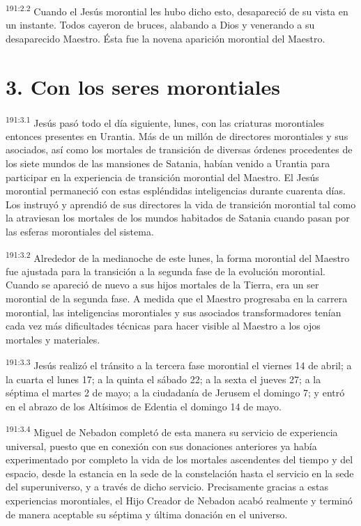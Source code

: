 \par 
\textsuperscript{191:2.2} Cuando el Jesús morontial les hubo dicho esto, desapareció de su vista en un instante. Todos cayeron de bruces, alabando a Dios y venerando a su desaparecido Maestro. Ésta fue la novena aparición morontial del Maestro.

\section*{3. Con los seres morontiales}
\par 
\textsuperscript{191:3.1} Jesús pasó todo el día siguiente, lunes, con las criaturas morontiales entonces presentes en Urantia. Más de un millón de directores morontiales y sus asociados, así como los mortales de transición de diversas órdenes procedentes de los siete mundos de las mansiones de Satania, habían venido a Urantia para participar en la experiencia de transición morontial del Maestro. El Jesús morontial permaneció con estas espléndidas inteligencias durante cuarenta días. Los instruyó y aprendió de sus directores la vida de transición morontial tal como la atraviesan los mortales de los mundos habitados de Satania cuando pasan por las esferas morontiales del sistema.

\par 
\textsuperscript{191:3.2} Alrededor de la medianoche de este lunes, la forma morontial del Maestro fue ajustada para la transición a la segunda fase de la evolución morontial. Cuando se apareció de nuevo a sus hijos mortales de la Tierra, era un ser morontial de la segunda fase. A medida que el Maestro progresaba en la carrera morontial, las inteligencias morontiales y sus asociados transformadores tenían cada vez más dificultades técnicas para hacer visible al Maestro a los ojos mortales y materiales.

\par 
\textsuperscript{191:3.3} Jesús realizó el tránsito a la tercera fase morontial el viernes 14 de abril; a la cuarta el lunes 17; a la quinta el sábado 22; a la sexta el jueves 27; a la séptima el martes 2 de mayo; a la ciudadanía de Jerusem el domingo 7; y entró en el abrazo de los Altísimos de Edentia el domingo 14 de mayo.

\par 
\textsuperscript{191:3.4} Miguel de Nebadon completó de esta manera su servicio de experiencia universal, puesto que en conexión con sus donaciones anteriores ya había experimentado por completo la vida de los mortales ascendentes del tiempo y del espacio, desde la estancia en la sede de la constelación hasta el servicio en la sede del superuniverso, y a través de dicho servicio. Precisamente gracias a estas experiencias morontiales, el Hijo Creador de Nebadon acabó realmente y terminó de manera aceptable su séptima y última donación en el universo.

